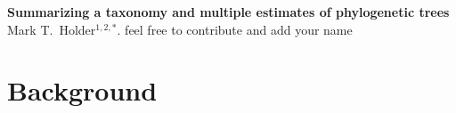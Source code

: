 \documentclass[11pt]{article}
\begin{document}
\begin{center}
    {\bf Summarizing a taxonomy and multiple estimates of phylogenetic trees} \\
{Mark T.~Holder$^{1,2,\ast}$. feel free to contribute and add your name}
\end{center}
\section{Background}

\end{document}
